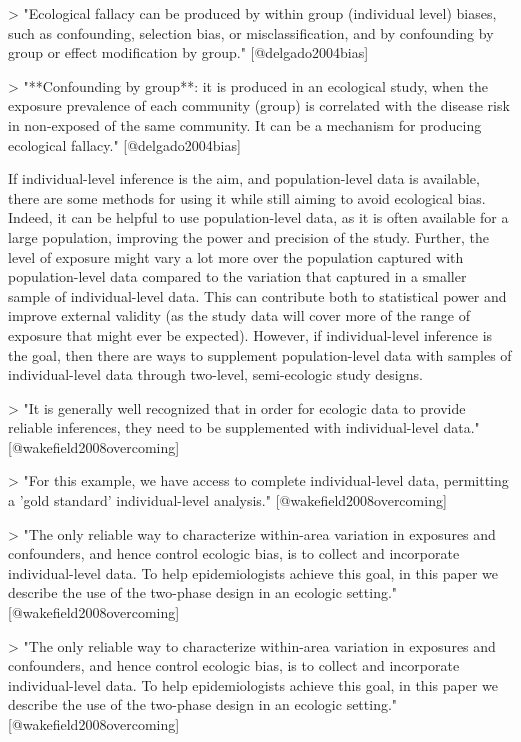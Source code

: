 > "Ecological fallacy can be produced by within group (individual level)
biases, such as confounding, selection bias, or misclassification, and
by confounding by group or effect modification by group." [@delgado2004bias]

> "**Confounding by group**: it is produced in an ecological study, when 
the exposure prevalence of each community (group) is correlated with 
the disease risk in non-exposed of the same community. It can be 
a mechanism for producing ecological fallacy." [@delgado2004bias]

If individual-level inference is the aim, and population-level data is
available, there are some methods for using it while still aiming to avoid
ecological bias. Indeed, it can be helpful to use population-level data, as it
is often available for a large population, improving the power and precision of
the study. Further, the level of exposure might vary a lot more over the
population captured with population-level data compared to the variation that
captured in a smaller sample of individual-level data. This can contribute both 
to statistical power and improve external validity (as the study data will cover
more of the range of exposure that might ever be expected). However, if
individual-level inference is the goal, then there are ways to supplement
population-level data with samples of individual-level data through two-level, 
semi-ecologic study designs.

> "It is generally well recognized that in order for ecologic data to provide
reliable inferences, they need to be supplemented with individual-level data."
[@wakefield2008overcoming]

> "For this example, we have access to complete individual-level data,
permitting a 'gold standard' individual-level analysis."
[@wakefield2008overcoming]

> "The only reliable way to characterize within-area variation in exposures
and confounders, and hence control ecologic bias, is to collect and incorporate
individual-level data. To help epidemiologists achieve this goal, in this paper
we describe the use of the two-phase design in an ecologic setting."
[@wakefield2008overcoming]

> "The only reliable way to characterize within-area variation in exposures
and confounders, and hence control ecologic bias, is to collect and incorporate
individual-level data. To help epidemiologists achieve this goal, in this 
paper we describe the use of the two-phase design in an ecologic setting."
[@wakefield2008overcoming]

